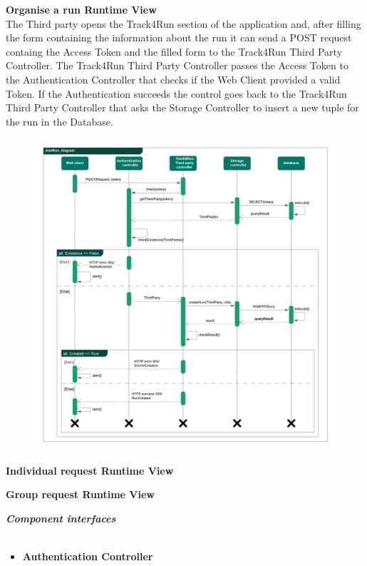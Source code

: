 \begin{legal}
\begin{legal}
				\newpage
				\item \textbf{Organise a run Runtime View}\\
The Third party opens the Track4Run section of the application and, after filling the form containing the information about the run it can send a POST request containg the Access Token and the filled form to the Track4Run Third Party Controller.
The Track4Run Third Party Controller passes the Access Token to the Authentication Controller that checks if the Web Client provided a valid Token.
If the Authentication succeeds the control goes back to the Track4Run Third Party Controller that asks the Storage Controller to insert a new tuple for the run in the Database.
				\begin{figure}[H]
				\includegraphics[width=\linewidth]{images/seq_diagrams/seq_OrganizeRun.png}\\
				\end{figure}
				
				\newpage
				\item \textbf{Individual request Runtime View}\\
				
				\newpage
				\item \textbf{Group request Runtime View}\\
			\end {legal}
		\item \textit{\textbf{Component interfaces}}\\\\
			\begin{itemize}
				\item \textbf{Authentication Controller} \\
				

\end{itemize}
\end{legal}
